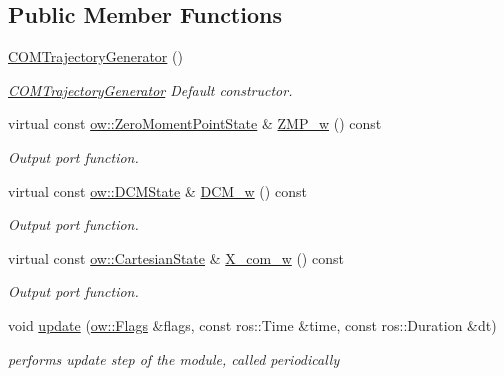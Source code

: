 \subsection*{Public Member Functions}
\begin{DoxyCompactItemize}
\item 
\hyperlink{classow__com__tg_1_1COMTrajectoryGenerator_aa9726f4796c23fa0156caf653a1e5e21}{C\+O\+M\+Trajectory\+Generator} ()\hypertarget{classow__com__tg_1_1COMTrajectoryGenerator_aa9726f4796c23fa0156caf653a1e5e21}{}\label{classow__com__tg_1_1COMTrajectoryGenerator_aa9726f4796c23fa0156caf653a1e5e21}

\begin{DoxyCompactList}\small\item\em \hyperlink{classow__com__tg_1_1COMTrajectoryGenerator}{C\+O\+M\+Trajectory\+Generator} Default constructor. \end{DoxyCompactList}\item 
virtual const \hyperlink{classow__core_1_1ZeroMomentPointState}{ow\+::\+Zero\+Moment\+Point\+State} \& \hyperlink{classow__com__tg_1_1COMTrajectoryGenerator_acec7a01af30b57cd99962a3e5d7bdf4f}{Z\+M\+P\+\_\+w} () const 
\begin{DoxyCompactList}\small\item\em Output port function. \end{DoxyCompactList}\item 
virtual const \hyperlink{classow__core_1_1DivergentComponentOfMotionState}{ow\+::\+D\+C\+M\+State} \& \hyperlink{classow__com__tg_1_1COMTrajectoryGenerator_a611454aadb3bc551ee85753e8135233a}{D\+C\+M\+\_\+w} () const 
\begin{DoxyCompactList}\small\item\em Output port function. \end{DoxyCompactList}\item 
virtual const \hyperlink{classow__core_1_1CartesianState}{ow\+::\+Cartesian\+State} \& \hyperlink{classow__com__tg_1_1COMTrajectoryGenerator_af52006557c655237b92f85dcf10b8b9b}{X\+\_\+com\+\_\+w} () const 
\begin{DoxyCompactList}\small\item\em Output port function. \end{DoxyCompactList}\item 
void \hyperlink{classow__com__tg_1_1COMTrajectoryGenerator_a872ee75bf3ff7da7cfec45d283061281}{update} (\hyperlink{classow__core_1_1Flags}{ow\+::\+Flags} \&flags, const ros\+::\+Time \&time, const ros\+::\+Duration \&dt)
\begin{DoxyCompactList}\small\item\em performs update step of the module, called periodically \end{DoxyCompactList}\item 

\end{DoxyCompactItemize}
